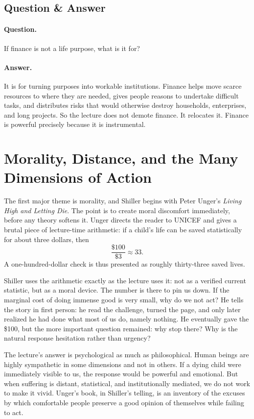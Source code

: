 \subsection{Question \& Answer}

\paragraph{Question.} If finance is not a life purpose, what is it for?

\paragraph{Answer.} It is for turning purposes into workable institutions. Finance helps move scarce resources to where they are needed, gives people reasons to undertake difficult tasks, and distributes risks that would otherwise destroy households, enterprises, and long projects. So the lecture does not demote finance. It relocates it. Finance is powerful precisely because it is instrumental.

\section{Morality, Distance, and the Many Dimensions of Action}

The first major theme is morality, and Shiller begins with Peter Unger's \emph{Living High and Letting Die}. The point is to create moral discomfort immediately, before any theory softens it. Unger directs the reader to UNICEF and gives a brutal piece of lecture-time arithmetic: if a child's life can be saved statistically for about three dollars, then
\begin{equation}
\frac{\$100}{\$3} \approx 33.
\end{equation}
A one-hundred-dollar check is thus presented as roughly thirty-three saved lives.

Shiller uses the arithmetic exactly as the lecture uses it: not as a verified current statistic, but as a moral device. The number is there to pin us down. If the marginal cost of doing immense good is very small, why do we not act? He tells the story in first person: he read the challenge, turned the page, and only later realized he had done what most of us do, namely nothing. He eventually gave the \$100, but the more important question remained: why stop there? Why is the natural response hesitation rather than urgency?

The lecture's answer is psychological as much as philosophical. Human beings are highly sympathetic in some dimensions and not in others. If a dying child were immediately visible to us, the response would be powerful and emotional. But when suffering is distant, statistical, and institutionally mediated, we do not work to make it vivid. Unger's book, in Shiller's telling, is an inventory of the excuses by which comfortable people preserve a good opinion of themselves while failing to act.

